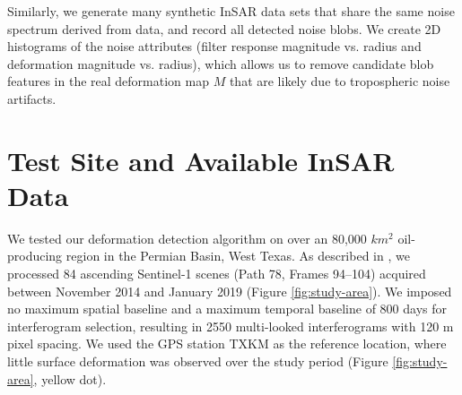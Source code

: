 Similarly, we generate many synthetic InSAR data sets that share the same noise spectrum derived from data, and record all detected noise blobs. We create 2D histograms of the noise attributes (filter response magnitude vs. radius and deformation magnitude vs. radius), which allows us to remove candidate blob features in the real deformation map $M$ that are likely due to tropospheric noise artifacts.

\section{Test Site and Available InSAR Data}
\label{sec:site}

We tested our deformation detection algorithm on over an 80,000 $km^2$ oil-producing region in the Permian Basin, West Texas.  As described in \citep{Staniewicz2020InsarRevealsComplex}, we processed 84 ascending Sentinel-1 scenes (Path 78, Frames 94–104) acquired between November 2014 and January 2019 (Figure \ref{fig:study-area}). We imposed no maximum spatial baseline and a maximum temporal baseline of 800 days for interferogram selection, resulting in 2550 multi-looked interferograms with 120 m pixel spacing.  We used the GPS station TXKM as the reference location, where little surface deformation was observed over the study period (Figure \ref{fig:study-area}, yellow dot).




